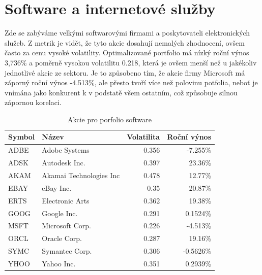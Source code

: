 \documentclass[12pt,a4paper]{report}
\begin{document}
  \section{Software a internetové služby}
    Zde se zabýváme velkými softwarovými firmami a poskytovateli elektronických služeb. Z metrik je vidět, že tyto akcie dosahují nemalých zhodnocení, ovšem často za cenu vysoké volatility. Optimalizované portfolio má nízký roční výnos 3,736\% a poměrně vysokou volatilitu 0.218, která je ovšem menší než u jakékoliv jednotlivé akcie ze sektoru. Je to způsobeno tím, že akcie firmy Microsoft má záporný roční výnos -4.513\%, ale přesto tvoří více než polovinu potfolia, neboť je vnímána jako konkurent k v podstatě všem ostatním, což způsobuje silnou zápornou korelaci. 
    \begin{table}[htb]
      \centering
      \begin{tabular}{|l|l|r|r|}
        \hline
        Symbol&Název&Volatilita&Roční výnos\\\hline\hline
        ADBE&Adobe Systems &0.356&-7.255\%\\\hline
        ADSK&Autodesk Inc. &0.397&23.36\%\\\hline
        AKAM&Akamai Technologies Inc &0.478&12.77\%\\\hline
        EBAY&eBay Inc. &0.35&20.87\%\\\hline
        ERTS&Electronic Arts &0.362&19.38\%\\\hline
        GOOG&Google Inc. &0.291&0.1524\%\\\hline
        MSFT&Microsoft Corp. &0.226&-4.513\%\\\hline
        ORCL&Oracle Corp. &0.287&19.16\%\\\hline
        SYMC&Symantec Corp. &0.306&-0.5626\%\\\hline
        YHOO&Yahoo Inc. &0.351&0.2939\%\\\hline
      \end{tabular}
      \caption{Akcie pro porfolio software}
    \end{table}
\end{document}
